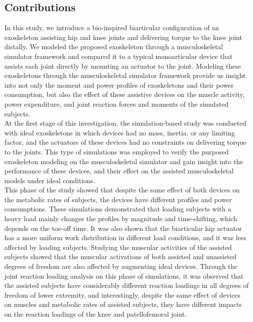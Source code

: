 \documentclass[10pt,letterpaper]{article}
\begin{document}
\subsection*{Contributions}
In this study, we introduce a bio-inspired biarticular configuration of an exoskeleton assisting hip and knee joints and delivering torque to the knee joint distally.  We modeled the proposed exoskeleton through a musculoskeletal simulator framework and compared it to a typical monoarticular device that assists each joint directly by mounting an actuator to the joint. Modeling these exoskeletons through the musculoskeletal simulator framework provide us insight into not only the moment and power profiles of exoskeletons and their power consumption, but also the effect of these assistive devices on the muscle activity, power expenditure, and joint reaction forces and moments of the simulated subjects.\\
At the first stage of this investigation, the simulation-based study was conducted with ideal exoskeletons in which devices had no mass, inertia, or any limiting factor, and the actuators of these devices had no constraints on delivering torque to the joints. This type of simulations was employed to verify the purposed exoskeleton modeling on the musculoskeletal simulator and gain insight into the performance of these devices, and their effect on the assisted musculoskeletal models under ideal conditions.\\
This phase of the study showed that despite the same effect of both devices on the metabolic rates of subjects, the devices have different profiles and power consumptions. These simulations demonstrated that loading subjects with a heavy load mainly changes the profiles by magnitude and time-shifting, which depends on the toe-off time. It was also shown that the biarticular hip actuator has a more uniform work distribution in different load conditions, and it was less affected by loading subjects. Studying the muscular activities of the assisted subjects showed that the muscular activations of both assisted and unassisted degrees of freedom are also affected by augmenting ideal devices. Through the joint reaction loading analysis on this phase of simulations, it was observed that the assisted subjects have considerably different reaction loadings in all degrees of freedom of lower extremity, and interestingly, despite the same effect of devices on muscles and metabolic rates of assisted subjects, they have different impacts on the reaction loadings of the knee and patellofemoral joint.\\
\end{document}
